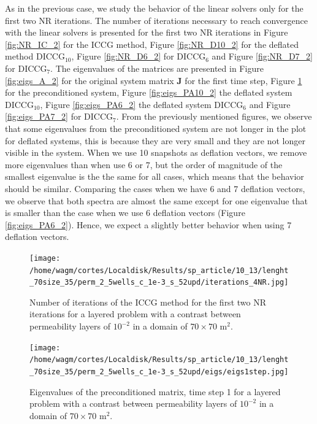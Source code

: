 \documentclass[12pt]{article}
\begin{document}
As in the previous case, we study the behavior of the linear solvers only for the first two NR iterations. 
The number of iterations necessary to reach convergence with the linear solvers is presented for the first two 
NR iterations in Figure \ref{fig:NR_IC_2} for the ICCG method, Figure \ref{fig:NR_D10_2} for the deflated method 
DICCG$_{10}$, Figure \ref{fig:NR_D6_2} for DICCG$_6$ and Figure \ref{fig:NR_D7_2} for DICCG$_7$.
The eigenvalues of the matrices are presented in Figure \ref{fig:eigs_A_2} for the original system matrix $\mathbf{J}$ 
for the first time step, Figure \ref{fig:eigs_MA_2} for the preconditioned system,  Figure \ref{fig:eigs_PA10_2} 
the deflated system DICCG$_{10}$, Figure \ref{fig:eigs_PA6_2} the deflated system DICCG$_6$ and Figure 
\ref{fig:eigs_PA7_2} for DICCG$_7$. From the previously mentioned figures, we observe that some eigenvalues from 
the preconditioned system are not longer in the plot for deflated systems, this is because they are very small and 
they are not longer visible in the system. When we use 10 snapshots as deflation vectors, we remove more eigenvalues 
than when use 6 or 7, but the order of magnitude of the smallest eigenvalue is the the same for all cases, which 
means that the behavior should be similar. Comparing the cases when we have 6 and 7 deflation vectors, we observe 
that both spectra are almost the same except for one eigenvalue that is smaller than the case when we 
use 6 deflation vectors (Figure \ref{fig:eigs_PA6_2}). Hence, we expect a slightly better behavior when using 7 
deflation vectors. \\

\begin{figure}[!h]
\centering
\begin{minipage}{.4\textwidth}
\vspace{-0.9cm}
\hspace{-1cm}
\texttt{[image: /home/wagm/cortes/Localdisk/Results/sp\_article/10\_13/lenght\_70size\_35/perm\_2\_5wells\_c\_1e-3\_s\_52upd/iterations\_4NR.jpg]}
\vspace{-1.3cm}
\caption{Number of iterations of the ICCG method for the first two NR iterations for a layered problem with a contrast between permeability layers of $10^{-2}$ in a domain of $70 \times 70$ m$^2$.}
\label{fig:NR_IC_2}
\end{minipage}%
\hspace{15mm}
\begin{minipage}{.4\textwidth}
 \centering
 \vspace{-5mm}
\texttt{[image: /home/wagm/cortes/Localdisk/Results/sp\_article/10\_13/lenght\_70size\_35/perm\_2\_5wells\_c\_1e-3\_s\_52upd/eigs/eigs1step.jpg]}
\caption{Eigenvalues of the preconditioned matrix, time step 1 for a layered problem with a contrast between permeability layers of $10^{-2}$ in a domain of $70 \times 70$ m$^2$.}
\label{fig:eigs_MA_2}
\end{minipage}
\end{figure}
\end{document}
